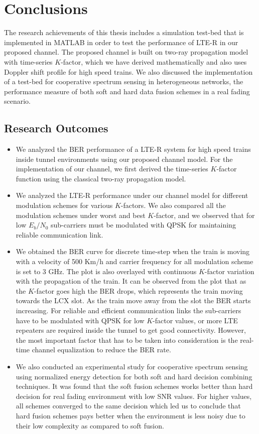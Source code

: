 \chapter{Conclusions}
\label{conclusion}
The research achievements of this thesis includes a simulation test-bed that is implemented in MATLAB in order to test the performance of LTE-R in our proposed channel. The proposed channel is built on two-ray propagation model with time-series $K$-factor, which we have derived mathematically and also uses Doppler shift profile for high speed trains. We also discussed the implementation of a test-bed for cooperative spectrum sensing in heterogeneous networks, the performance measure of both soft and hard data fusion schemes in a real fading scenario. 

\section{Research Outcomes}
\begin{itemize}
\item We analyzed the BER performance of a LTE-R system for high speed trains inside tunnel environments using our proposed channel model. For the implementation of our channel, we first derived the time-series $K$-factor function using the classical two-ray propagation model.

\item We analyzed the LTE-R performance under our channel model for different modulation schemes for various $K$-factors. We also compared all the modulation schemes under worst and best $K$-factor, and we observed that for low $E_b/N_0$ sub-carriers must be modulated with QPSK for maintaining reliable communication link.

\item We obtained the BER curve for discrete time-step when the train is moving with a velocity of 500 Km/h and carrier frequency for all modulation scheme is set to 3 GHz. The plot is also overlayed with continuous $K$-factor variation with the propagation of the train. It can be observed from the plot that as the $K$-factor goes high the BER drops, which represents the train moving towards the LCX slot. As the train move away from the slot the BER starts increasing. For reliable and efficient communication links the sub-carriers have to be modulated with QPSK for low $K$-factor values, or more LTE repeaters are required inside the tunnel to get good connectivity. However, the most important factor that has to be taken into consideration is the real-time channel equalization to reduce the BER rate.

\item We also conducted an experimental study for cooperative spectrum sensing using normalized energy detection for both soft and hard decision combining techniques. It was found that the soft fusion schemes works better than hard decision for real fading environment with low SNR values. For higher values, all schemes converged to the same decision which led us to conclude that hard fusion schemes pays better when the environment is less noisy due to their low complexity as compared to soft fusion.
\end{itemize}


